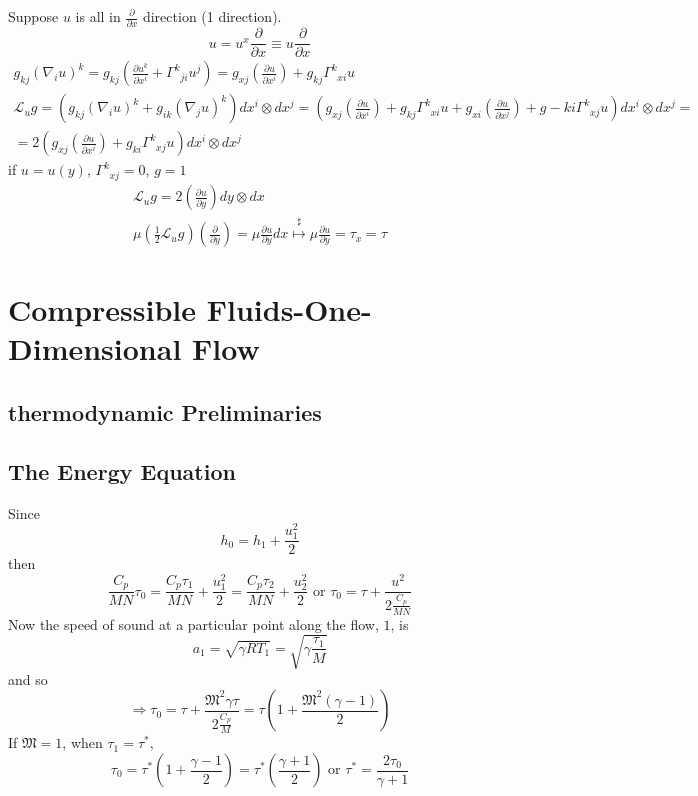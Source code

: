 \documentclass[twoside,landscape,10pt]{amsart}
\theoremstyle{plain}
\theoremstyle{definition}
\theoremstyle{remark}
\theoremstyle{remark}
\begin{document}
\begin{multicols*}{2}
Suppose $u$ is all in $\frac{ \partial }{ \partial x}$ direction (1 direction).  
\[
u = u^x \frac{ \partial }{ \partial x} \equiv u \frac{ \partial }{ \partial x}
\]
\[
\begin{gathered}
  g_{kj} (\nabla_i u)^k = g_{kj} \left( \frac{ \partial u^k}{ \partial x^i} + \Gamma^k_{ \; \; ji} u^j \right) = g_{xj} \left( \frac{ \partial u}{ \partial x^i} \right) + g_{kj} \Gamma^k_{ \; \; xi } u \\
  \mathcal{L}_u g = (g_{kj} (\nabla_i u)^k + g_{ik} (\nabla_j u)^k ) dx^i \otimes dx^j = (g_{xj} \left( \frac{ \partial u}{ \partial x^i} \right) + g_{kj} \Gamma^k_{ \; \; xi} u + g_{xi} \left( \frac{ \partial u }{ \partial x^j} \right) + g-{ki} \Gamma^k_{ \; \; xj} u ) dx^i \otimes dx^j = \\
  = 2 \left( g_{xj} \left( \frac{ \partial u}{ \partial x^i} \right)+ g_{ki} \Gamma^k_{ \; \; xj} u \right) dx^i \otimes dx^j
\end{gathered}
\]
if $u=u(y)$, $\Gamma^k_{ \; \; xj} = 0$, $g=1$
\[
\begin{gathered}
  \mathcal{L}_u g = 2 \left( \frac{ \partial u }{ \partial y} \right) dy \otimes dx \\ 
  \mu\left( \frac{1}{2} \mathcal{L}_u g \right) \left( \frac{ \partial }{ \partial y} \right) = \mu \frac{ \partial u}{ \partial y } dx \overset{\sharp}{\mapsto } \mu \frac{ \partial u}{ \partial y} = \tau_x = \tau
\end{gathered}
\]





\section{Compressible Fluids-One-Dimensional Flow}

\subsection{thermodynamic Preliminaries}

\subsection{The Energy Equation}

Since 
\[
h_0 = h_1 + \frac{u_1^2}{2}
\]
then
\[
\frac{C_p}{MN} \tau_0 = \frac{C_p \tau_1}{MN} + \frac{u_1^2}{2} = \frac{C_p \tau_2}{MN} + \frac{u_2^2}{2} \text{ or } \tau_0 = \tau + \frac{u^2}{ 2 \frac{C_p}{MN} }
\]
Now the speed of sound at a particular point along the flow, $1$, is 
\[
a_1 = \sqrt{ \gamma RT_1 } = \sqrt{ \gamma \frac{\tau_1}{M} }
\]
and so 
\[
\Longrightarrow \tau_0 = \tau + \frac{ \mathfrak{M}^2 \gamma \tau }{ 2 \frac{C_p}{M}} = \tau \left( 1 + \frac{ \mathfrak{M}^2 (\gamma-1) }{2} \right)
\]
If $\mathfrak{M}=1$, when $\tau_1=\tau^*$, 
\[
\tau_0 = \tau^* \left( 1 + \frac{\gamma -1}{2} \right) = \tau^* \left( \frac{\gamma + 1 }{2} \right)
\text{ or } \tau^* = \frac{ 2\tau_0 }{ \gamma + 1 } 
\]


\end{multicols*}
\end{document}
